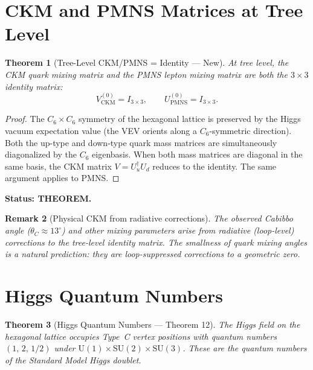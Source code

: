 \documentclass[11pt,letterpaper]{article}
\newtheorem{theorem}{Theorem}[section]
\newtheorem{remark}[theorem]{Remark}
\begin{document}
\section{CKM and PMNS Matrices at Tree Level}

\begin{theorem}[Tree-Level CKM/PMNS = Identity --- New]\label{thm:ckm}
At tree level, the CKM quark mixing matrix and the PMNS lepton mixing matrix
are both the $3\times3$ identity matrix:
\begin{equation}
  V_\mathrm{CKM}^{(0)} = I_{3\times3},
  \qquad
  U_\mathrm{PMNS}^{(0)} = I_{3\times3}.
\end{equation}
\end{theorem}

\begin{proof}
The $C_6\times C_6$ symmetry of the hexagonal lattice is preserved by the
Higgs vacuum expectation value (the VEV orients along a $C_6$-symmetric
direction).  Both the up-type and down-type quark mass matrices are
simultaneously diagonalized by the $C_6$ eigenbasis.  When both mass
matrices are diagonal in the same basis, the CKM matrix $V = U_u^\dagger U_d$
reduces to the identity.  The same argument applies to PMNS.
\end{proof}

\textbf{Status: THEOREM.}

\begin{remark}[Physical CKM from radiative corrections]
The observed Cabibbo angle ($\theta_C \approx 13^\circ$) and other mixing
parameters arise from radiative (loop-level) corrections to the tree-level
identity matrix.  The smallness of quark mixing angles is a natural prediction:
they are loop-suppressed corrections to a geometric zero.
\end{remark}

\section{Higgs Quantum Numbers}

\begin{theorem}[Higgs Quantum Numbers --- Theorem 12]\label{thm:T12}
The Higgs field on the hexagonal lattice occupies Type~C vertex positions
with quantum numbers $(1,\,2,\,1/2)$ under
$\mathrm{U}(1)\times\mathrm{SU}(2)\times\mathrm{SU}(3)$.
These are the quantum numbers of the Standard Model Higgs doublet.
\end{theorem}
\end{document}
